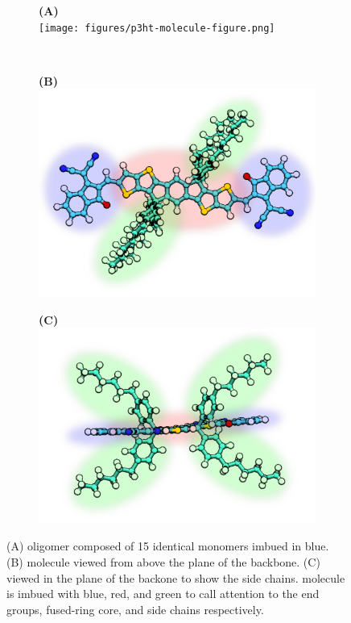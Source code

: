 \begin{figure}
\centering
\begin{subfigure}{.5\textwidth}
    \centering
    \textbf{(A)}  \\
    \texttt{[image: figures/p3ht-molecule-figure.png]}
\end{subfigure}%
\\
\begin{subfigure}{.3\textwidth}
    \textbf{(B)} 
    \centering
    \includegraphics[width=\textwidth]{figures/itic-backbone-figure.png}
\end{subfigure}%
\begin{subfigure}{.3\textwidth}
    \textbf{(C)} 
    \centering
    \includegraphics[width=\textwidth]{figures/itic-sidechain-figure.png}
\end{subfigure}
    \caption[short]{(A)  oligomer composed of 15 identical monomers imbued in blue.
    (B)  molecule viewed from above the plane of the backbone. 
    (C)  viewed in the plane of the backone to show the side chains. 
    molecule is imbued with blue, red, and green to call attention to the end groups, fused-ring core, and
    side chains respectively.}
\label{molecules}
\end{figure}

